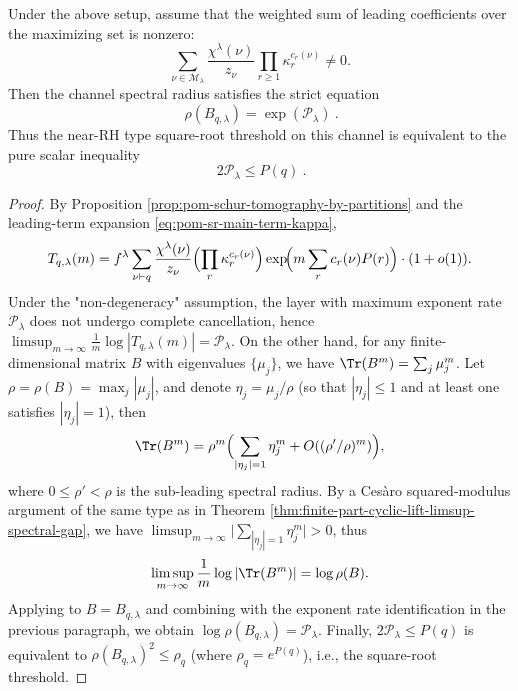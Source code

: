 \begin{theorem}\label{thm:pom-schur-channel-radius-character-sieve}
Under the above setup, assume that the weighted sum of leading coefficients over the maximizing set is nonzero:
\[
\sum_{\nu\in\mathcal{M}_\lambda}\frac{\chi^\lambda(\nu)}{z_\nu}\prod_{r\ge 1}\kappa_r^{c_r(\nu)}\neq 0.
\]
Then the channel spectral radius satisfies the strict equation
\[
\boxed{\ \rho(B_{q,\lambda})=\exp(\mathcal{P}_\lambda)\ }.
\]
Thus the near-RH type square-root threshold on this channel is equivalent to the pure scalar inequality
\[
\boxed{\ 2\mathcal{P}_\lambda\le P(q)\ }.
\]
\end{theorem}
\begin{proof}
By Proposition \ref{prop:pom-schur-tomography-by-partitions} and the leading-term expansion \eqref{eq:pom-sr-main-term-kappa},
\[
T_{q,\lambda}(m)
=
f^\lambda\sum_{\nu\vdash q}\frac{\chi^\lambda(\nu)}{z_\nu}
\Bigl(\prod_r \kappa_r^{c_r(\nu)}\Bigr)
\exp\!\Bigl(m\sum_r c_r(\nu)P(r)\Bigr)\cdot(1+o(1)).
\]
Under the "non-degeneracy" assumption, the layer with maximum exponent rate \(\mathcal{P}_\lambda\) does not undergo complete cancellation, hence
\(
\limsup_{m\to\infty}\frac{1}{m}\log|T_{q,\lambda}(m)|=\mathcal{P}_\lambda
\).
On the other hand, for any finite-dimensional matrix \(B\) with eigenvalues \(\{\mu_j\}\), we have
\(
\Tr(B^m)=\sum_j \mu_j^m
\).
Let \(\rho=\rho(B)=\max_j|\mu_j|\), and denote \(\eta_j=\mu_j/\rho\) (so that \(|\eta_j|\le 1\) and at least one satisfies \(|\eta_j|=1\)), then
\[
\Tr(B^m)=\rho^m\Bigl(\sum_{|\eta_j|=1}\eta_j^m+O((\rho'/\rho)^m)\Bigr),
\]
where \(0\le \rho'<\rho\) is the sub-leading spectral radius. By a Ces\`aro squared-modulus argument of the same type as in Theorem \ref{thm:finite-part-cyclic-lift-limsup-spectral-gap}, we have
\(\limsup_{m\to\infty}\bigl|\sum_{|\eta_j|=1}\eta_j^m\bigr|>0\),
thus
\[
\limsup_{m\to\infty}\frac{1}{m}\log|\Tr(B^m)|=\log\rho(B).
\]
Applying to \(B=B_{q,\lambda}\) and combining with the exponent rate identification in the previous paragraph, we obtain \(\log\rho(B_{q,\lambda})=\mathcal{P}_\lambda\).
Finally, \(2\mathcal{P}_\lambda\le P(q)\) is equivalent to \(\rho(B_{q,\lambda})^2\le \rho_q\) (where \(\rho_q=e^{P(q)}\)), i.e., the square-root threshold.
\end{proof}




